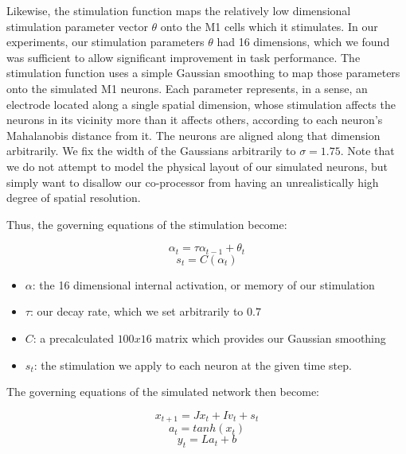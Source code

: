 \documentclass[12pt]{iopart}
\begin{document}
Likewise, the stimulation function maps the relatively low dimensional stimulation
parameter vector $\theta$ onto the M1 cells which it stimulates. In our experiments,
our stimulation parameters $\theta$ had 16 dimensions, which we found was
sufficient to allow significant improvement in task performance. The stimulation
function uses a simple Gaussian smoothing to map those parameters onto the simulated
M1 neurons. Each parameter represents, in a sense, an electrode located along a single
spatial dimension, whose stimulation affects the neurons in its vicinity more than
it affects others, according to each neuron's Mahalanobis distance from it. The neurons
are aligned along that dimension arbitrarily. We fix the width of the Gaussians
arbitrarily to $\sigma=1.75$. Note that we do not attempt to model the physical
layout of our simulated neurons, but simply want to disallow our co-processor
from having an unrealistically high degree of spatial resolution.

Thus, the governing equations of the stimulation become:

\begin{equation}
\alpha_{t} = \tau\alpha_{t-1} + \theta_{t}
\end{equation}
\begin{equation}
s_{t} = C(\alpha_{t})
\end{equation}

\begin{itemize}
	\item $\alpha$: the 16 dimensional internal activation, or memory
        of our stimulation
	\item $\tau$: our decay rate, which we set arbitrarily to $0.7$
	\item $C$: a precalculated $100 x 16$ matrix which provides our
	Gaussian smoothing
	\item $s_{t}$: the stimulation we apply to each neuron at the
	given time step.
\end{itemize}

The governing equations of the simulated network then become:

\begin{equation}
x_{t+1} = Jx_{t} + Iv_{t} + s_{t}
\end{equation}
\begin{equation}
a_{t} = tanh(x_{t})
\end{equation}
\begin{equation}
y_{t} = La_{t} + b
\end{equation}
\end{document}
